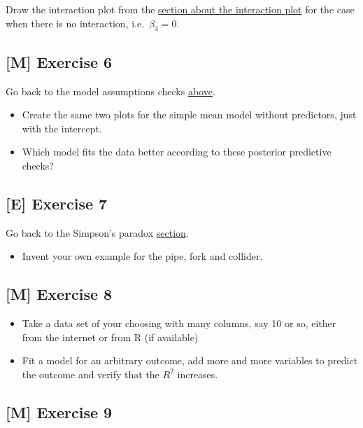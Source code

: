 \documentclass[
]{book}
\providecommand{\tightlist}{%
  \setlength{\itemsep}{0pt}\setlength{\parskip}{0pt}}
\begin{document}
Draw the interaction plot from the \hyperref[interaction_plot]{section about the interaction plot}
for the case when there is no interaction, i.e.~\(\beta_3 = 0\).

\subsection{{[}M{]} Exercise 6}\label{exercise6_multiple_regression}

Go back to the model assumptions checks \hyperref[check_model_bayes]{above}.

\begin{itemize}
\tightlist
\item
  Create the same two plots for the simple mean model without predictors, just with the intercept.
\item
  Which model fits the data better according to these posterior predictive checks?
\end{itemize}

\subsection{{[}E{]} Exercise 7}\label{exercise7_multiple_regression}

Go back to the Simpson's paradox \hyperref[simpsons_paradox]{section}.

\begin{itemize}
\tightlist
\item
  Invent your own example for the pipe, fork and collider.
\end{itemize}

\subsection{{[}M{]} Exercise 8}\label{exercise8_multiple_regression}

\begin{itemize}
\tightlist
\item
  Take a data set of your choosing with many columns, say 10 or so, either from the internet
  or from R (if available)
\item
  Fit a model for an arbitrary outcome, add more and more variables to predict the outcome
  and verify that the \(R^2\) increases.
\end{itemize}

\subsection{{[}M{]} Exercise 9}\label{exercise9_multiple_regression}
\end{document}
